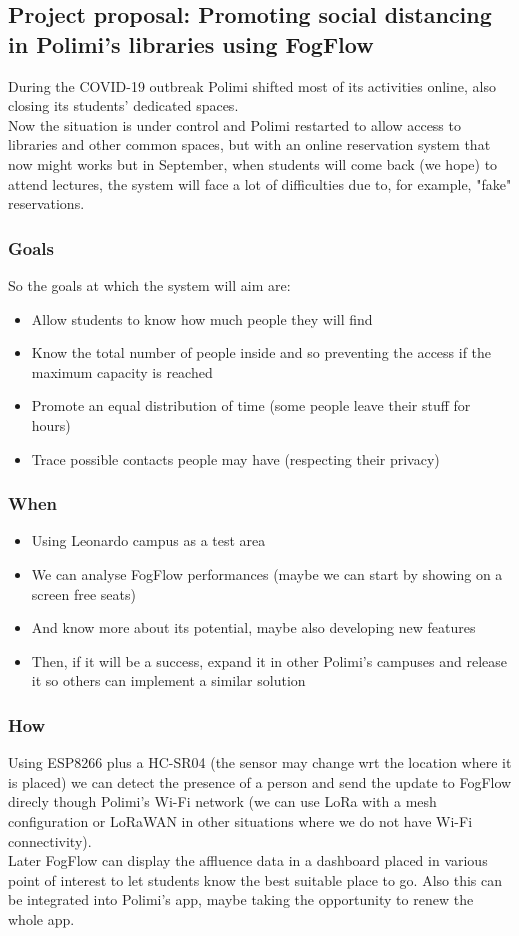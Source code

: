 \documentclass[a4paper]{article}
\begin{document}
\subsection{\textbf{Project proposal}: Promoting social distancing in Polimi's libraries using FogFlow}
During the COVID-19 outbreak Polimi shifted most of its activities online, also closing its students' dedicated spaces.\\
Now the situation is under control and Polimi restarted to allow access to libraries and other common spaces, but with an online reservation system that now might works but in September, when students will come back (we hope) to attend lectures, the system will face a lot of difficulties due to, for example, "fake" reservations.
\subsubsection{Goals}
So the goals at which the system will aim are:
\begin{itemize}
    \item Allow students to know how much people they will find
    \item Know the total number of people inside and so preventing the access if the maximum capacity is reached
    \item Promote an equal distribution of time (some people leave their stuff for hours)
    \item Trace possible contacts people may have (respecting their privacy)
\end{itemize}
\subsubsection{When}
\begin{itemize}
    \item Using Leonardo campus as a test area
    \item We can analyse FogFlow performances (maybe we can start by showing on a screen free seats)
    \item And know more about its potential, maybe also developing new features
    \item Then, if it will be a success, expand it in other Polimi’s campuses and release it so others can implement a similar solution
\end{itemize}
\subsubsection{How}
Using ESP8266 plus a HC-SR04 (the sensor may change wrt the location where it is placed) we can detect the presence of a person and send the update to FogFlow direcly though Polimi's Wi-Fi network (we can use LoRa with a mesh configuration or LoRaWAN in other situations where we do not have Wi-Fi connectivity).\\
Later FogFlow can display the affluence data in a dashboard placed in various point of interest to let students know the best suitable place to go. Also this can be integrated into Polimi's app, maybe taking the opportunity to renew the whole app.
\end{document}
